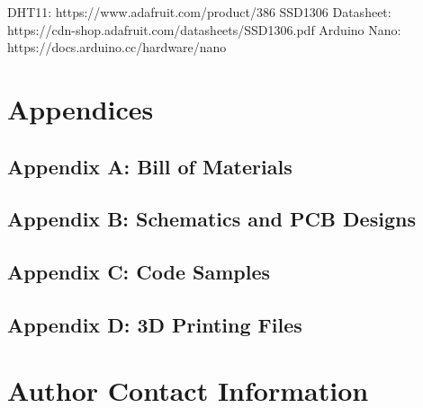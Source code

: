 \documentclass{article}
\begin{document}
\begin{multicols}{2}
		\begin{thebibliography}{X}
			 DHT11: https://www.adafruit.com/product/386
			 SSD1306 Datasheet: https://cdn-shop.adafruit.com/datasheets/SSD1306.pdf
			 Arduino Nano: https://docs.arduino.cc/hardware/nano
		\end{thebibliography}	
	
		\section{Appendices}
		\lipsum[65-67]
		
		\subsection{Appendix A: Bill of Materials}
		
		\subsection{Appendix B: Schematics and PCB Designs}
		
		\subsection{Appendix C: Code Samples}
		
		\subsection{Appendix D: 3D Printing Files}
		
		\section{Author Contact Information}
		
	\end{multicols} %
	
\end{document}
